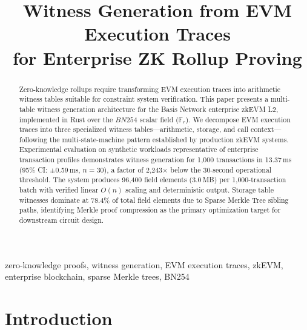 \documentclass[conference]{IEEEtran}
\newcommand{\Fr}{\mathbb{F}_r}
\newcommand{\bn}{BN254}
\begin{document}
\title{Witness Generation from EVM Execution Traces\\for Enterprise ZK Rollup Proving}

\author{
}

\maketitle
\thispagestyle{plain}

\begin{abstract}
Zero-knowledge rollups require transforming EVM execution traces into
arithmetic witness tables suitable for constraint system verification.
This paper presents a multi-table witness generation architecture for
the Basis Network enterprise zkEVM L2, implemented in Rust over the
$\bn{}$ scalar field ($\Fr$). We decompose EVM execution traces into
three specialized witness tables---arithmetic, storage, and call
context---following the multi-state-machine pattern established by
production zkEVM systems. Experimental evaluation on synthetic
workloads representative of enterprise transaction profiles demonstrates
witness generation for 1{,}000 transactions in 13.37\,ms (95\% CI:
$\pm$0.59\,ms, $n=30$), a factor of 2{,}243$\times$ below the
30-second operational threshold. The system produces 96{,}400 field
elements (3.0\,MB) per 1{,}000-transaction batch with verified linear
$O(n)$ scaling and deterministic output. Storage table witnesses
dominate at 78.4\% of total field elements due to Sparse Merkle Tree
sibling paths, identifying Merkle proof compression as the primary
optimization target for downstream circuit design.
\end{abstract}

\begin{IEEEkeywords}
zero-knowledge proofs, witness generation, EVM execution traces,
zkEVM, enterprise blockchain, sparse Merkle trees, BN254
\end{IEEEkeywords}

\section{Introduction}
\label{sec:introduction}
\end{document}
